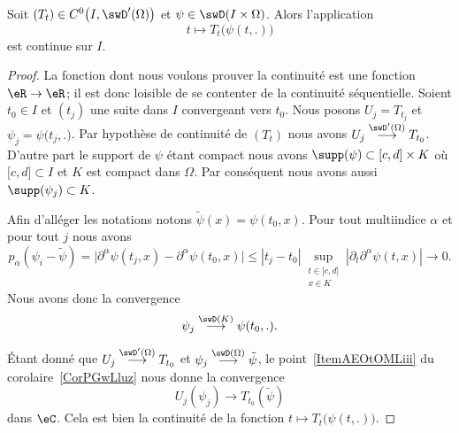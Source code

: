\begin{proposition} \label{PropOTlWzog}
    Soit \( (T_t)\in C^0\big( I,\swD'(\Omega) \big)\) et \( \psi\in\swD(I\times \Omega)\). Alors l'application
    \begin{equation}
        t\mapsto T_t\big( \psi(t,.) \big)
    \end{equation}
    est continue sur \( I\).
\end{proposition}

\begin{proof}
    La fonction dont nous voulons prouver la continuité est une fonction \( \eR\to\eR\); il est donc loisible de se contenter de la continuité séquentielle. Soient \( t_0\in I\) et \( (t_j)\) une suite dans \( I\) convergeant vers \( t_0\). Nous posons \( U_j=T_{t_j}\) et \( \psi_j=\psi\big( t_j,. \big)\). Par hypothèse de continuité de \( (T_t)\) nous avons \( U_j\stackrel{\swD'(\Omega)}{\longrightarrow}T_{t_0}\). D'autre part le support de \( \psi\) étant compact nous avons \( \supp(\psi)\subset \mathopen[ c , d \mathclose]\times K\) où \( \mathopen[ c , d \mathclose]\subset I\) et \( K\) est compact dans \( \Omega\). Par conséquent nous avons aussi \( \supp(\psi_j)\subset K\).

    Afin d'alléger les notations notons \( \tilde \psi(x)=\psi(t_0,x)\). Pour tout multiindice \( \alpha\) et pour tout \( j\) nous avons
    \begin{equation}
        p_{\alpha}(\psi_i-\tilde \psi)=\Big|  \partial^{\alpha}\psi(t_j,x)-\partial^{\alpha}\psi(t_0,x)    \Big|\leq | t_j-t_0 |\sup_{\substack{t\in\mathopen[ c , d \mathclose]\\x\in K}}| \partial_t\partial^{\alpha}\psi(t,x) |\to 0.
    \end{equation}
    Nous avons donc la convergence
    \begin{equation}
        \psi_j\stackrel{\swD(K)}{\longrightarrow}\psi(t_0,.).
    \end{equation}

    Étant donné que \( U_j\stackrel{\swD'(\Omega)}{\longrightarrow}T_{t_0}\) et \( \psi_j\stackrel{\swD(\Omega)}{\longrightarrow}\tilde \psi\), le point~\ref{ItemAEOtOMLiii} du corolaire~\ref{CorPGwLluz} nous donne la convergence
    \begin{equation}
        U_j(\psi_j)\to T_{t_0}(\tilde \psi)
    \end{equation}
    dans \( \eC\). Cela est bien la continuité de la fonction \( t\mapsto T_t\big( \psi(t,.) \big)\).
\end{proof}


